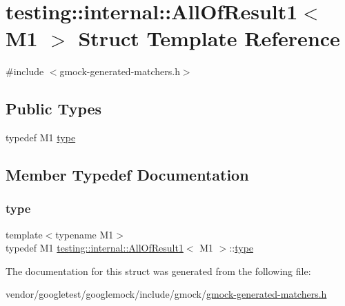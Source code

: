 \hypertarget{structtesting_1_1internal_1_1_all_of_result1}{}\section{testing\+:\+:internal\+:\+:All\+Of\+Result1$<$ M1 $>$ Struct Template Reference}
\label{structtesting_1_1internal_1_1_all_of_result1}


{\ttfamily \#include $<$gmock-\/generated-\/matchers.\+h$>$}

\subsection*{Public Types}
\begin{DoxyCompactItemize}
\item 
typedef M1 \hyperlink{structtesting_1_1internal_1_1_all_of_result1_a19b95d4ddf7f4044a78665d9e253db10}{type}
\end{DoxyCompactItemize}


\subsection{Member Typedef Documentation}
\mbox{\label{structtesting_1_1internal_1_1_all_of_result1_a19b95d4ddf7f4044a78665d9e253db10}} 
\subsubsection{\texorpdfstring{type}{type}}
{\footnotesize\ttfamily template$<$typename M1$>$ \\
typedef M1 \hyperlink{structtesting_1_1internal_1_1_all_of_result1}{testing\+::internal\+::\+All\+Of\+Result1}$<$ M1 $>$\+::\hyperlink{structtesting_1_1internal_1_1_all_of_result1_a19b95d4ddf7f4044a78665d9e253db10}{type}}



The documentation for this struct was generated from the following file\+:\begin{DoxyCompactItemize}
\item 
vendor/googletest/googlemock/include/gmock/\hyperlink{gmock-generated-matchers_8h}{gmock-\/generated-\/matchers.\+h}\end{DoxyCompactItemize}
